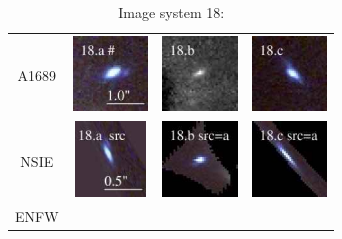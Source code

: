\documentclass[useAMS,usenatbib]{mn2e}
\begin{document}
\begin{table}
  \caption{Image system 18:}\vspace{0mm}
  \begin{tabular}{cccc}
    \multicolumn{1}{m{1cm}}{{\Large A1689}}
    & \multicolumn{1}{m{1.7cm}}{\includegraphics[height=2.00cm,clip]{figs/nsie_img/rgb.img_18_a.ps}}
    & \multicolumn{1}{m{1.7cm}}{\includegraphics[height=2.00cm,clip]{figs/nsie_img/eF775outac_sub.img_18_b.ps}}
    & \multicolumn{1}{m{1.7cm}}{\includegraphics[height=2.00cm,clip]{figs/nsie_img/rgb.img_18_c.ps}} \\
    \multicolumn{1}{m{1cm}}{{\Large NSIE}}
    & \multicolumn{1}{m{1.7cm}}{\includegraphics[height=2.00cm,clip]{figs/nsie_img/rgb.src_18_a.ps}}
    & \multicolumn{1}{m{1.7cm}}{\includegraphics[height=2.00cm,clip]{figs/nsie_img/rgb.pre_18_b_a_tri.ps}}
    & \multicolumn{1}{m{1.7cm}}{\includegraphics[height=2.00cm,clip]{figs/nsie_img/rgb.pre_18_c_a_tri.ps}} \\
    \multicolumn{1}{m{1cm}}{{\Large ENFW}}

\end{tabular}
\end{table}
\end{document}
